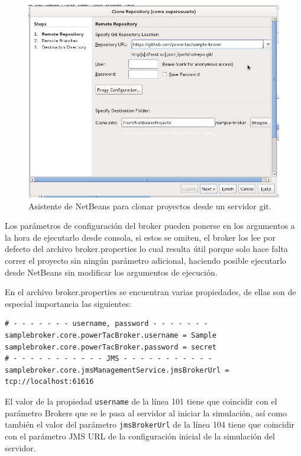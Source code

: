 \begin{figure}[h]
	\centering
	\includegraphics[width=13cm]{img/asistenteNetbeansClonar.png}
	\caption{Asistente de NetBeans para clonar proyectos desde un servidor git.}
	\label{fig:asistenteNetbeansClonar}
\end{figure}

Los parámetros de configuración del broker pueden ponerse en los argumentos a la hora de ejecutarlo desde consola, si estos se omiten, el broker los lee por defecto del archivo broker.properties lo cual resulta útil porque solo hace falta correr el proyecto sin ningún parámetro adicional, haciendo posible ejecutarlo desde NetBeans sin modificar los argumentos de ejecución.

En el archivo broker.properties se encuentran varias propiedades, de ellas son de especial importancia las siguientes:\\


\begin{lstlisting}[frame=single]  
# - - - - - - - username, password - - - - - - -
samplebroker.core.powerTacBroker.username = Sample
samplebroker.core.powerTacBroker.password = secret
# - - - - - - - - - - - JMS - - - - - - - - - - -
samplebroker.core.jmsManagementService.jmsBrokerUrl =
tcp://localhost:61616
\end{lstlisting}

El valor de la propiedad \texttt{username} de la línea 101 
tiene que coincidir con el parámetro Brokers que se le pasa al servidor al iniciar la simulación, así como también el valor del parámetro \texttt{jmsBrokerUrl} de la línea 104 tiene que coincidir con el parámetro JMS URL de la configuración inicial de la simulación del servidor.\\

